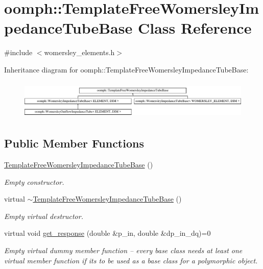 \hypertarget{classoomph_1_1TemplateFreeWomersleyImpedanceTubeBase}{}\section{oomph\+:\+:Template\+Free\+Womersley\+Impedance\+Tube\+Base Class Reference}
\label{classoomph_1_1TemplateFreeWomersleyImpedanceTubeBase}


{\ttfamily \#include $<$womersley\+\_\+elements.\+h$>$}

Inheritance diagram for oomph\+:\+:Template\+Free\+Womersley\+Impedance\+Tube\+Base\+:\begin{figure}[H]
\begin{center}
\leavevmode
\includegraphics[height=1.896163cm]{classoomph_1_1TemplateFreeWomersleyImpedanceTubeBase}
\end{center}
\end{figure}
\subsection*{Public Member Functions}
\begin{DoxyCompactItemize}
\item 
\hyperlink{classoomph_1_1TemplateFreeWomersleyImpedanceTubeBase_a52044dbd661e704066760426547fc3e8}{Template\+Free\+Womersley\+Impedance\+Tube\+Base} ()
\begin{DoxyCompactList}\small\item\em Empty constructor. \end{DoxyCompactList}\item 
virtual \hyperlink{classoomph_1_1TemplateFreeWomersleyImpedanceTubeBase_a534a6daaac837e88cdb05961c90d636b}{$\sim$\+Template\+Free\+Womersley\+Impedance\+Tube\+Base} ()
\begin{DoxyCompactList}\small\item\em Empty virtual destructor. \end{DoxyCompactList}\item 
virtual void \hyperlink{classoomph_1_1TemplateFreeWomersleyImpedanceTubeBase_a95c60d5f7661be3ee298cd2b4bd45de5}{get\+\_\+response} (double \&p\+\_\+in, double \&dp\+\_\+in\+\_\+dq)=0
\begin{DoxyCompactList}\small\item\em Empty virtual dummy member function -- every base class needs at least one virtual member function if it\textquotesingle{}s to be used as a base class for a polymorphic object. \end{DoxyCompactList}\end{DoxyCompactItemize}
